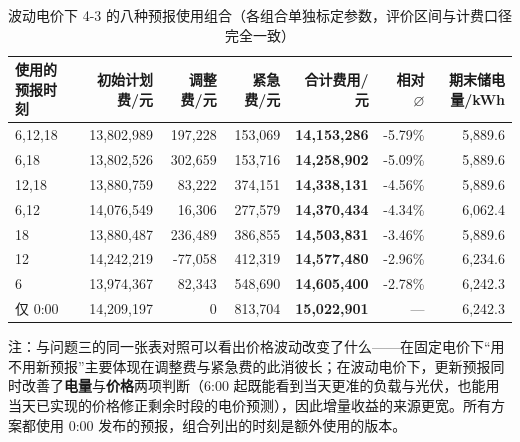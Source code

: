 \begin{table}[htbp]
  \centering
  \caption{波动电价下 4-3 的八种预报使用组合（各组合单独标定参数，评价区间与计费口径完全一致）}
  \label{tab:p4-combo}
  \footnotesize
  \begin{tabular}{lrrrrrr}
    \toprule
    使用的预报时刻 & 初始计划费/元 & 调整费/元 & 紧急费/元 & 合计费用/元 & 相对 $\varnothing$ & 期末储电量/kWh \\
    \midrule
    {6,12,18} & 13,802,989 & 197,228 & 153,069 & \textbf{14,153,286} & -5.79\% & 5,889.6 \\
    {6,18} & 13,802,526 & 302,659 & 153,716 & \textbf{14,258,902} & -5.09\% & 5,889.6 \\
    {12,18} & 13,880,759 & 83,222 & 374,151 & \textbf{14,338,131} & -4.56\% & 5,889.6 \\
    {6,12} & 14,076,549 & 16,306 & 277,579 & \textbf{14,370,434} & -4.34\% & 6,062.4 \\
    {18} & 13,880,487 & 236,489 & 386,855 & \textbf{14,503,831} & -3.46\% & 5,889.6 \\
    {12} & 14,242,219 & -77,058 & 412,319 & \textbf{14,577,480} & -2.96\% & 6,234.6 \\
    {6} & 13,974,367 & 82,343 & 548,690 & \textbf{14,605,400} & -2.78\% & 6,242.3 \\
    仅 0:00 & 14,209,197 & 0 & 813,704 & \textbf{15,022,901} & --- & 6,242.3 \\
    \bottomrule
  \end{tabular}
  \par\vspace{2pt}
  \begin{minipage}{.92\textwidth}\footnotesize
    注：与问题三的同一张表对照可以看出价格波动改变了什么——在固定电价下``用不用新预报''主要体现在调整费与紧急费的此消彼长；在波动电价下，更新预报同时改善了\textbf{电量}与\textbf{价格}两项判断（6:00 起既能看到当天更准的负载与光伏，也能用当天已实现的价格修正剩余时段的电价预测），因此增量收益的来源更宽。所有方案都使用 0:00 发布的预报，组合列出的时刻是额外使用的版本。
  \end{minipage}
\end{table}

